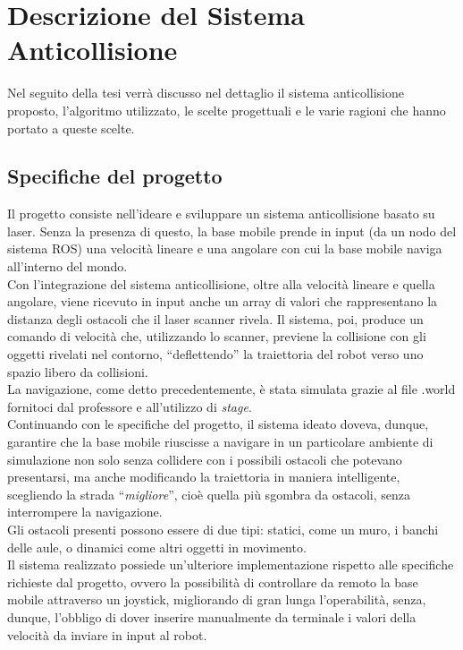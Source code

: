\chapter{Descrizione del Sistema Anticollisione}
\label{descrizione}

Nel seguito della tesi verrà discusso nel dettaglio il sistema anticollisione proposto, l’algoritmo utilizzato, le scelte progettuali e le varie ragioni che hanno portato a queste scelte.

\section{Specifiche del progetto}

Il progetto consiste nell’ideare e sviluppare un sistema anticollisione basato su laser. Senza la presenza di questo, la base mobile prende in input (da un nodo del sistema ROS) una velocità lineare e una angolare con cui la base mobile naviga all’interno del mondo. \\
Con l’integrazione del sistema anticollisione, oltre alla velocità lineare e quella angolare, viene ricevuto in input anche un array di valori che rappresentano la distanza degli ostacoli che il laser scanner rivela. Il sistema, poi, produce un comando di velocità che, utilizzando lo scanner, previene la collisione con gli oggetti rivelati nel contorno, “deflettendo” la traiettoria del robot verso uno spazio libero da collisioni.\\
La navigazione, come detto precedentemente, è stata simulata grazie al file .world fornitoci dal professore e all’utilizzo di \textit{stage}.\\
Continuando con le specifiche del progetto, il sistema ideato doveva, dunque, garantire che la base mobile riuscisse a navigare in un particolare ambiente di simulazione non solo senza collidere con i possibili ostacoli che potevano presentarsi, ma anche modificando la traiettoria in maniera intelligente, scegliendo la strada ``\textit{migliore}'', cioè quella più sgombra da ostacoli, senza interrompere la navigazione. \\
Gli ostacoli presenti possono essere di due tipi: statici, come un muro, i banchi delle aule, o dinamici come altri oggetti in movimento.\\
Il sistema realizzato possiede un’ulteriore implementazione rispetto alle specifiche richieste dal progetto, ovvero la possibilità di controllare da remoto la base mobile attraverso un joystick, migliorando di gran lunga l'operabilità, senza, dunque, l’obbligo di dover inserire manualmente da terminale i valori della velocità da inviare in input al robot. \\

